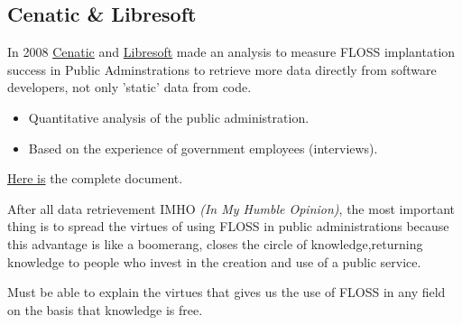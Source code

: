 \subsection{Cenatic \& Libresoft}

\par In 2008 \href{http://www.cenatic.es/sobre-cenatic}{Cenatic} and \href{http://libresoft.es/about}{Libresoft} made an analysis to measure FLOSS implantation success in Public Adminstrations to retrieve more data directly from software developers, not only 'static' data from code.

\begin{itemize}
	\item Quantitative analysis of the public administration.
	\item Based on the experience of government employees (interviews).
\end{itemize}

\href{http://observatorio.cenatic.es/index.php?option=com_content&amp;view=article&amp;id=39:software-de-fuentes-abiertas-para-el-desarrollo-de-la-administracion-publica-espanola-una-vision-global-2008&amp;catid=5:administraciones-publicas&amp;Itemid=21}{Here is} the complete document.

\par After all data retrievement IMHO \textit{(In My Humble Opinion)}, the most important thing is to spread the virtues of using FLOSS in public administrations because this advantage is like a boomerang, closes the circle of knowledge,returning knowledge to people who invest in the creation and use of a public service.

\par Must be able to explain the virtues that gives us the use of FLOSS in any field on the basis that knowledge is free.


